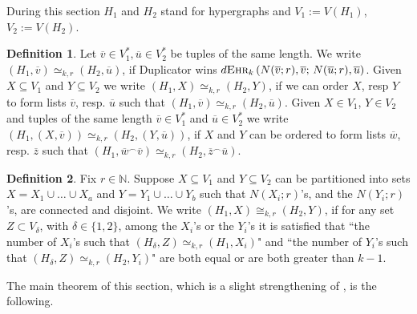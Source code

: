 \documentclass[12pt,notitlepage,a4paper]{article}
\theoremstyle{definition}
\newtheorem{definition}{Definition}[section]
\newcommand{\N}{\mathbb{N}}
\newcommand{\ehr}{\textsc{Ehr}}
\begin{document}
During this section $H_1$ and $H_2$ stand for
hypergraphs and $V_1:=V(H_1)$, $V_2:=V(H_2)$.

\begin{definition} \label{def:similar}
Let $\overline{v} \in V_1^*, 
\overline{u} \in V_2^*$ be tuples of the same length.
We write $(H_1,\overline{v})\simeq_{k,r}(H_2, \overline{u})$, if Duplicator wins
$d\ehr_k\left(N(\overline{v};r),
\overline{v};\, N(\overline{u};r),\overline{u}\right)$.
Given $X\subseteq V_1$ and $Y\subseteq V_2$
we write $(H_1,X)\simeq_{k,r} (H_2,Y)$, if we can order $X$, resp $Y$ to form
lists $\overline{v}$, resp. $\overline{u}$ such that 
$(H_1,\overline{v})\simeq_{k,r}(H_2,\overline{u})$. 
Given $X\in V_1$, $Y\in V_2$ and 
tuples of the same length $\overline{v}\in V_1^*$ and
$\overline{u}\in V_2^*$ we write
 $\left(H_1, (X,\overline{v})  \right)
\simeq_{k,r} \left(H_2, (Y,\overline{u})  \right)$, if
$X$ and $Y$ can be ordered to form lists
$\overline{w}$, resp. $\overline{z}$ such that
$(H_1,\overline{w}^\smallfrown \overline{v})
\simeq_{k,r} (H_2,\overline{z}^\smallfrown \overline{u})$. 
\end{definition}

\begin{definition} \label{def:analogous}
Fix $r\in \N$. Suppose $X\subseteq V_1$ and 
$Y\subseteq V_2$ can
be partitioned into sets $X=X_1\cup \dots \cup X_a$
and $Y=Y_1\cup \dots \cup Y_b$ 
such that $N(X_i;r)$'s, and the
$N(Y_i;r)$'s, are connected and disjoint. 
We write $(H_1,X)\cong_{k,r} (H_2,Y)$, 
if for any set $Z\subset V_\delta$, with $\delta\in \{1,2\}$,
among the $X_i$'s or the $Y_i$'s
it is satisfied that ``the number of $X_i$'s  
such that $(H_\delta, Z) \simeq_{k,r} (H_1,X_i)$" 
and ``the number of $Y_i$'s such that
$(H_\delta,Z)\simeq_{k,r} (H_2,Y_i)$"
are both equal or are both greater than $k-1$.
\end{definition}

The main theorem of this section, which
is a slight strengthening of \cite[Theorem 
2.6.7]{spencer2013strange}, is the following.
\end{document}
